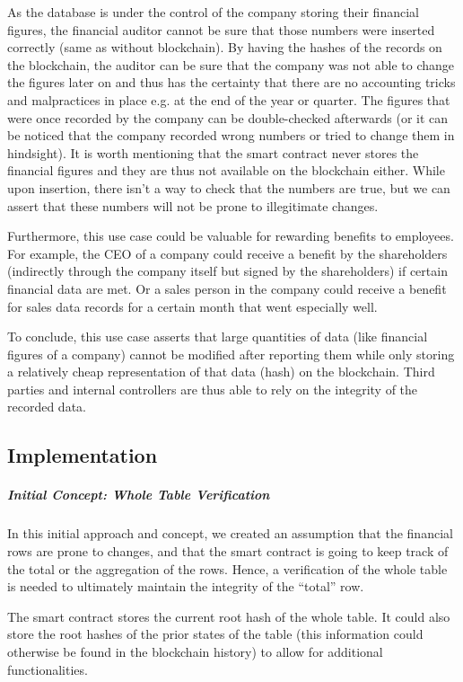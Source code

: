 As the database is under the control of the company storing their financial figures, the financial auditor cannot be sure that those numbers were inserted correctly (same as without blockchain). By having the hashes of the records on the blockchain, the auditor can be sure that the company was not able to change the figures later on and thus has the certainty that there are no accounting tricks and malpractices in place e.g. at the end of the year or quarter. The figures that were once recorded by the company can be double-checked afterwards (or it can be noticed that the company recorded wrong numbers or tried to change them in hindsight). It is worth mentioning that the smart contract never stores the financial figures and they are thus not available on the blockchain either. While upon insertion, there isn’t a way to check that the numbers are true, but we can assert that these numbers will not be prone to illegitimate changes.

Furthermore, this use case could be valuable for rewarding benefits to employees. For example, the CEO of a company could receive a benefit by the shareholders (indirectly through the company itself but signed by the shareholders) if certain financial data are met. Or a sales person in the company could receive a benefit for sales data records for a certain month that went especially well.

To conclude, this use case asserts that large quantities of data (like financial figures of a company) cannot be modified after reporting them while only storing a relatively cheap representation of that data (hash) on the blockchain. Third parties and internal controllers are thus able to rely on the integrity of the recorded data.

\subsection{Implementation}
\subparagraph{Initial Concept: Whole Table Verification}

In this initial approach and concept, we created an assumption that the financial rows are prone to changes, and that the smart contract is going to keep track of the total or the aggregation of the rows. Hence, a verification of the whole table is needed to ultimately maintain the integrity of the “total” row.

The smart contract stores the current root hash of the whole table. It could also store the root hashes of the prior states of the table (this information could otherwise be found in the blockchain history) to allow for additional functionalities.

